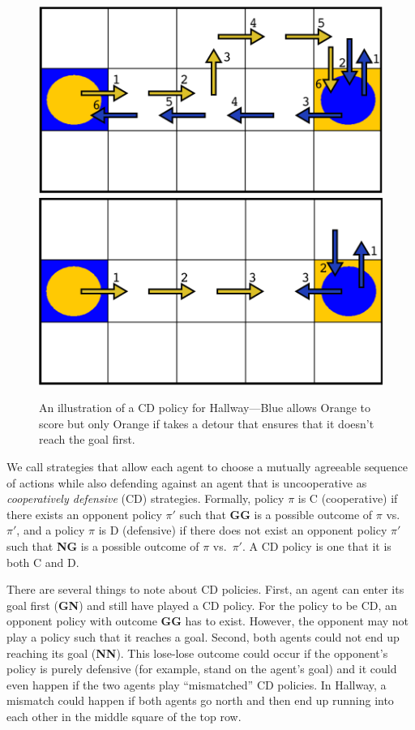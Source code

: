 \documentclass[letterpaper]{article}
\begin{document}
\begin{figure}
\centering
\includegraphics[width=0.71\columnwidth]{figures/Hall_CDs/CD_fig2.png}
\includegraphics[width=0.71\columnwidth]{figures/Hall_CDs/CD_fig3.png}
\caption{An illustration of a CD policy for Hallway---Blue allows
Orange to score but only Orange if takes a detour that ensures that it
doesn't reach the goal first.}
\label{f:CD}
\end{figure}

We call strategies that allow each agent to choose a mutually
agreeable sequence of actions while also defending against an agent that is
uncooperative as \emph{cooperatively defensive} (CD)
strategies. Formally, policy $\pi$ is C (cooperative) if there exists an opponent
policy $\pi'$ such that {\bf GG} is a possible outcome of $\pi$ vs.\
$\pi'$, and a policy $\pi$ is D (defensive) if there does not exist an opponent
policy $\pi'$ such that {\bf NG} is a possible outcome of $\pi$ vs.\
$\pi'$. A CD policy is one that it is both C and D.

There are several things to note about CD policies. First, an agent
can enter its goal first ({\bf GN}) and still have played a CD
policy. For the policy to be CD, an opponent policy with outcome {\bf
GG} has to exist. However, the opponent may not play a policy such
that it reaches a goal. Second, both agents could not end up reaching its goal
({\bf NN}). This lose-lose outcome could occur if the opponent's
policy is purely defensive (for example, stand on the agent's goal)
and it could even happen if the two agents play ``mismatched'' CD
policies. In Hallway, a mismatch could happen if both agents go north
and then end up running into each other in the middle square of the
top row.
 
\end{document}
